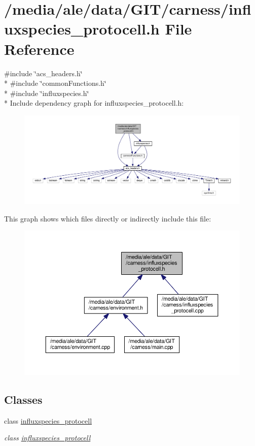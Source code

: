 \hypertarget{a00080}{\section{/media/ale/data/\-G\-I\-T/carness/influxspecies\-\_\-protocell.h File Reference}
\label{a00080}
}
{\ttfamily \#include \char`\"{}acs\-\_\-headers.\-h\char`\"{}}\\*
{\ttfamily \#include \char`\"{}common\-Functions.\-h\char`\"{}}\\*
{\ttfamily \#include \char`\"{}influxspecies.\-h\char`\"{}}\\*
Include dependency graph for influxspecies\-\_\-protocell.\-h\-:\nopagebreak
\begin{figure}[H]
\begin{center}
\leavevmode
\includegraphics[width=350pt]{a00152}
\end{center}
\end{figure}
This graph shows which files directly or indirectly include this file\-:\nopagebreak
\begin{figure}[H]
\begin{center}
\leavevmode
\includegraphics[width=350pt]{a00153}
\end{center}
\end{figure}
\subsection*{Classes}
\begin{DoxyCompactItemize}
\item 
class \hyperlink{a00007}{influxspecies\-\_\-protocell}
\begin{DoxyCompactList}\small\item\em class \hyperlink{a00007}{influxspecies\-\_\-protocell} \end{DoxyCompactList}\end{DoxyCompactItemize}
